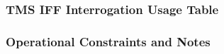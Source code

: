 \documentclass[11pt, a4paper, twoside]{report}
\begin{document}
\subsubsection{TMS IFF Interrogation Usage Table}
\label{sec:C4-S3-S5-S3}




\subsubsection{Operational Constraints and Notes}
\label{sec:C4-S3-S5-S4}

\end{document}
